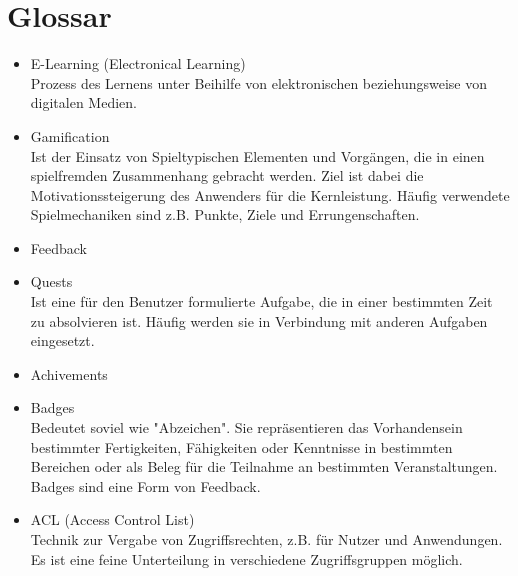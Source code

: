\documentclass[11pt,a4paper]{scrreprt}
\begin{document}
\chapter{Glossar}
\begin{itemize}
\item E-Learning (Electronical Learning) \\
Prozess des Lernens unter Beihilfe von elektronischen beziehungsweise von digitalen Medien.
\item Gamification \\
Ist der Einsatz von Spieltypischen Elementen und Vorgängen, die in einen spielfremden Zusammenhang gebracht werden. Ziel ist dabei die Motivationssteigerung des Anwenders für die Kernleistung. Häufig verwendete Spielmechaniken sind z.B. Punkte, Ziele und Errungenschaften.
\item Feedback \\

\item Quests \\
Ist eine für den Benutzer formulierte Aufgabe, die in einer bestimmten Zeit zu absolvieren ist. Häufig werden sie in Verbindung mit anderen Aufgaben eingesetzt.
\item Achivements \\

\item Badges \\
Bedeutet soviel wie "Abzeichen". Sie repräsentieren das Vorhandensein bestimmter Fertigkeiten, Fähigkeiten oder Kenntnisse in bestimmten Bereichen oder als Beleg für die Teilnahme an bestimmten Veranstaltungen. Badges sind eine Form von Feedback.
\item ACL (Access Control List) \\
Technik zur Vergabe von Zugriffsrechten, z.B. für Nutzer und Anwendungen. Es ist eine feine Unterteilung in verschiedene Zugriffsgruppen möglich.
\end{itemize}
\end{document}
